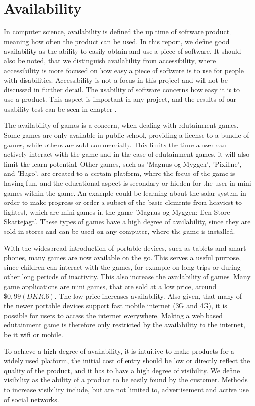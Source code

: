\section{Availability}
\label{sec:availability}

In computer science, availability is defined the up time of software product, meaning how often the product can be used. In this report, we define good availability as the ability to easily obtain and use a piece of software. It should also be noted, that we distinguish availability from accessibility, where accessibility is more focused on how easy a piece of software is to use for people with disabilities. Accessibility is not a focus in this project and will not be discussed in further detail. The usability of software concerns how easy it is to use a product. This aspect is important in any project, and the results of our usability test can be seen in chapter .

The availability of games is a concern, when dealing with edutainment games. Some games are only available in public school, providing a license to a bundle of games, while others are sold commercially. This limits the time a user can actively interact with the game and in the case of edutainment games, it will also limit the learn potential. Other games, such as 'Magnus og Myggen', 'Pixiline', and 'Hugo', are created to a certain platform, where the focus of the game is having fun, and the educational aspect is secondary or hidden for the user in mini games within the game. An example could be learning about the solar system in order to make progress or order a subset of the basic elements from heaviest to lightest, which are mini games in the game 'Magnus og Myggen: Den Store Skattejagt'. These types of games have a high degree of availability, since they are sold in stores and can be used on any computer, where the game is installed.

With the widespread introduction of portable devices, such as tablets and smart phones, many games are now available on the go. This serves a useful purpose, since children can interact with the games, for example on long trips or during other long periods of inactivity. This also increase the availability of games. Many game applications are mini games, that are sold at a low price, around $\$0,99 (DKR. 6)$. The low price increases availability. Also given, that many of the newer portable devices support fast mobile internet (3G and 4G), it is possible for users to access the internet everywhere. Making a web based edutainment game is therefore only restricted by the availability to the internet, be it wifi or mobile.

To achieve a high degree of availability, it is intuitive to make products for a widely used platform, the initial cost of entry should be low or directly reflect the quality of the product, and it has to have a high degree of visibility. We define visibility as the ability of a product to be easily found by the customer. Methods to increase visibility include, but are not limited to, advertisement and active use of social networks.